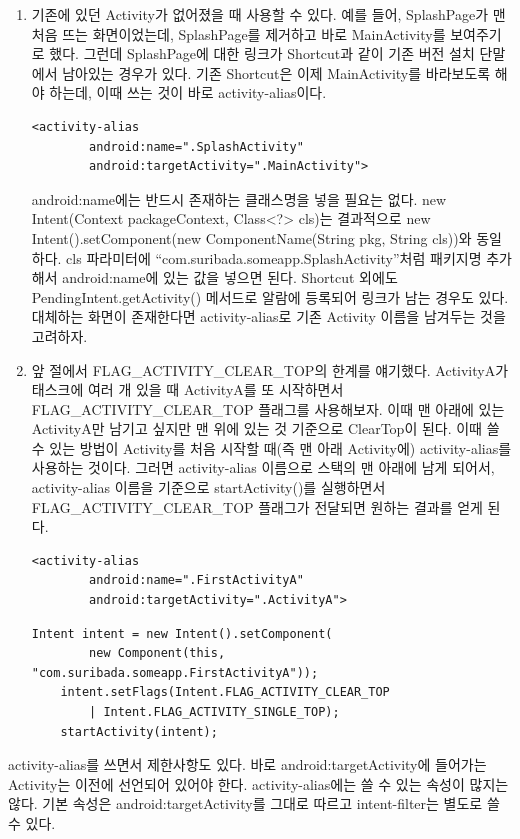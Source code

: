 \begin{enumerate}
\item 기존에 있던 Activity가 없어졌을 때 사용할 수 있다.
예를 들어, SplashPage가 맨 처음 뜨는 화면이었는데, SplashPage를 제거하고 바로 MainActivity를 보여주기로 했다.
그런데 SplashPage에 대한 링크가 Shortcut과 같이 기존 버전 설치 단말에서 남아있는 경우가 있다.
기존 Shortcut은 이제 MainActivity를 바라보도록 해야 하는데, 이때 쓰는 것이 바로 activity-alias이다.
\begin{lstlisting}[frame=single]
	<activity-alias
    	android:name=".SplashActivity"
        android:targetActivity=".MainActivity">
\end{lstlisting}
android:name에는 반드시 존재하는 클래스명을 넣을 필요는 없다. new Intent(Context packageContext, Class<?> cls)는 결과적으로 new Intent().setComponent(new ComponentName(String pkg, String cls))와 동일하다. cls 파라미터에  ``com.suribada.someapp.SplashActivity''처럼 패키지명 추가해서 android:name에 있는 값을 넣으면 된다. 
Shortcut 외에도 PendingIntent.getActivity() 메서드로 알람에 등록되어 링크가 남는 경우도 있다. 대체하는 화면이 존재한다면 activity-alias로 기존 Activity 이름을 남겨두는 것을 고려하자.

\item 앞 절에서 FLAG\_ACTIVITY\_CLEAR\_TOP의 한계를 얘기했다. ActivityA가 태스크에 여러 개 있을 때 ActivityA를 또 시작하면서 FLAG\_ACTIVITY\_CLEAR\_TOP 플래그를 사용해보자. 이때 맨 아래에 있는 ActivityA만 남기고 싶지만 맨 위에 있는 것 기준으로 ClearTop이 된다. 이때 쓸 수 있는 방법이 Activity를 처음 시작할 때(즉 맨 아래 Activity에) activity-alias를 사용하는 것이다. 그러면 activity-alias 이름으로 스택의 맨 아래에 남게 되어서, activity-alias 이름을 기준으로 startActivity()를 실행하면서 FLAG\_ACTIVITY\_CLEAR\_TOP 플래그가 전달되면 원하는 결과를 얻게 된다.
\begin{lstlisting}[frame=single]
	<activity-alias
    	android:name=".FirstActivityA"
        android:targetActivity=".ActivityA">
\end{lstlisting}
\begin{lstlisting}[frame=single]
	Intent intent = new Intent().setComponent(
		new Component(this, "com.suribada.someapp.FirstActivityA"));
	intent.setFlags(Intent.FLAG_ACTIVITY_CLEAR_TOP 
		| Intent.FLAG_ACTIVITY_SINGLE_TOP);
	startActivity(intent);
\end{lstlisting}
\end{enumerate} 

activity-alias를 쓰면서 제한사항도 있다.
바로 android:targetActivity에 들어가는 Activity는 이전에 선언되어 있어야 한다. 
activity-alias에는 쓸 수 있는 속성이 많지는 않다. 기본 속성은 android:targetActivity를 그대로 따르고 intent-filter는 별도로 쓸 수 있다.
